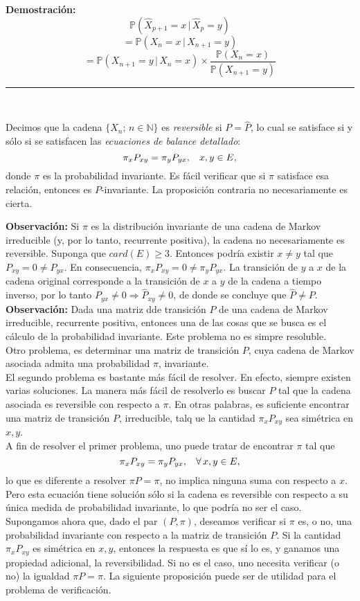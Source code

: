 \documentclass[a4paper]{article}
\newcommand{\prob}{\mathbb{P}}
\numberwithin{equation}{subsection}
\numberwithin{definicion}{subsection}
\def\N{\mathbb N}
\begin{document}
\textbf{Demostración: }
\[\prob(\hat{X}_{p+1} = x\,|\,\hat{X}_p = y)\]
\[= \prob(X_n =x\,|\,X_{n+1}=y)\]
\[= \prob(X_{n+1} = y\,|\,X_n=x)\times \frac{\prob(X_n=x)}{\prob(X_{n+1}=y)}\]
\rule{0.7em}{0.7em}\\ \newline

Decimos que la cadena $\{X_n;\,n\in\N\}$ es \textit{reversible} si $P=\hat{P}$, lo cual se satisface si y sólo si se satisfacen las \textit{ecuaciones de balance detallado}:
\[\pi_x P_{xy} = \pi_y P_{yx},\hspace{0.3cm}x,y\in E,\]
donde $\pi$ es la probabilidad invariante. Es fácil verificar que si $\pi$ satisface esa relación, entonces es $P$-invariante. La proposición contraria no necesariamente es cierta.\\ \newline
 
\textbf{Observación: }Si $\pi$ es la distribución invariante de una cadena de Markov irreducible (y, por lo tanto, recurrente positiva), la cadena no necesariamente es reversible. Suponga que $card(E)\geq 3$. Entonces podría existir $x\neq y$ tal que $P_{xy}=0\neq P_{yx}$. En consecuencia, $\pi_xP_{xy}=0\neq \pi_yP_{yx}$. La transición de $y$ a $x$ de la cadena original corresponde a la transición de $x$ a $y$ de la cadena a tiempo inverso, por lo tanto $P_{yx}\neq 0 \Longrightarrow \hat{P}_{xy} \neq 0$, de donde se concluye que $\hat{P}\neq P$.\\

\textbf{Observación: }Dada una matriz dde transición $P$ de una cadena de Markov irreducible, recurrente positiva, entonces una de las cosas que se busca es el cálculo de la probabilidad invariante. Este problema no es simpre resoluble.\\ 
Otro problema, es determinar una matriz de transición $P$, cuya cadena de Markov asociada admita una probabilidad $\pi$, invariante.\\ 
El segundo problema es bastante más fácil de resolver. En efecto, siempre existen varias soluciones. La manera más fácil de resolverlo es buscar $P$ tal que la cadena asociada es reversible con respecto a $\pi$. En otras palabras, es suficiente encontrar una matriz de transición $P$, irreducible, talq ue la cantidad $\pi_x P_{xy}$ sea simétrica en $x,y$.\\
A fin de resolver el primer problema, uno puede tratar de encontrar $\pi$ tal que
\[\pi_x P_{xy} = \pi_y P_{yx},\hspace{0.3cm}\forall\,x,y\in E,\]
lo que es diferente a resolver $\pi P= \pi$, no implica ninguna suma con respecto a $x$. Pero esta ecuación tiene solución sólo si la cadena es reversible con respecto a su única medida de probabilidad invariante, lo que podría no ser el caso.\\
Supongamos ahora que, dado el par $(P,\pi)$, deseamos verificar si $\pi$ es, o no, una probabilidad invariante con respecto a la matriz de transición $P$. Si la cantidad $\pi_x P_{xy}$ es simétrica en $x,y$, entonces la respuesta es que sí lo es, y ganamos una propiedad adicional, la reversibilidad. Si no es el caso, uno necesita verificar (o no) la igualdad $\pi P = \pi$. La siguiente proposición puede ser de utilidad para el problema de verificación.
\end{document}
